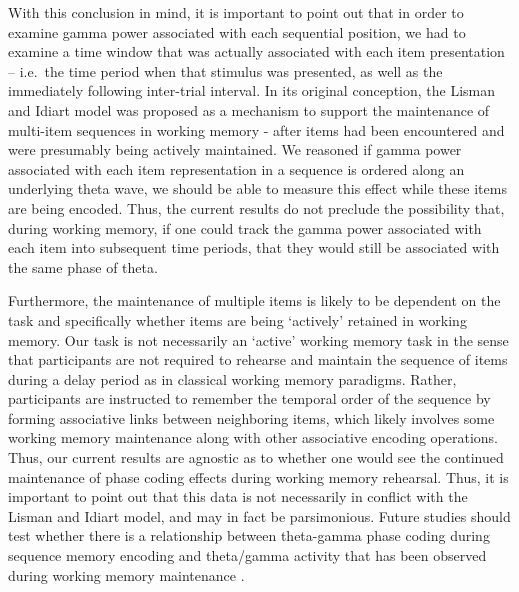 With this conclusion in mind, it is important to point out that in order
to examine gamma power associated with each sequential position, we had
to examine a time window that was actually associated with each item
presentation -- i.e.~the time period when that stimulus was presented,
as well as the immediately following inter-trial interval. In its
original conception, the Lisman and Idiart model was proposed as a
mechanism to support the maintenance of multi-item sequences in working
memory - after items had been encountered and were presumably being
actively maintained. We reasoned if gamma power associated with each
item representation in a sequence is ordered along an underlying theta
wave, we should be able to measure this effect while these items are
being encoded. Thus, the current results do not preclude the possibility
that, during working memory, if one could track the gamma power
associated with each item into subsequent time periods, that they would
still be associated with the same phase of theta.

Furthermore, the maintenance of multiple items is likely to be dependent
on the task and specifically whether items are being `actively' retained
in working memory. Our task is not necessarily an `active' working
memory task in the sense that participants are not required to rehearse
and maintain the sequence of items during a delay period as in classical
working memory paradigms. Rather, participants are instructed to
remember the temporal order of the sequence by forming associative links
between neighboring items, which likely involves some working memory
maintenance along with other associative encoding operations. Thus, our
current results are agnostic as to whether one would see the continued
maintenance of phase coding effects during working memory rehearsal.
Thus, it is important to point out that this data is not necessarily in
conflict with the Lisman and Idiart model, and may in fact be
parsimonious. Future studies should test whether there is a relationship
between theta-gamma phase coding during sequence memory encoding and
theta/gamma activity that has been observed during working memory
maintenance \autocite{axmacher_cross-frequency_2010}.

